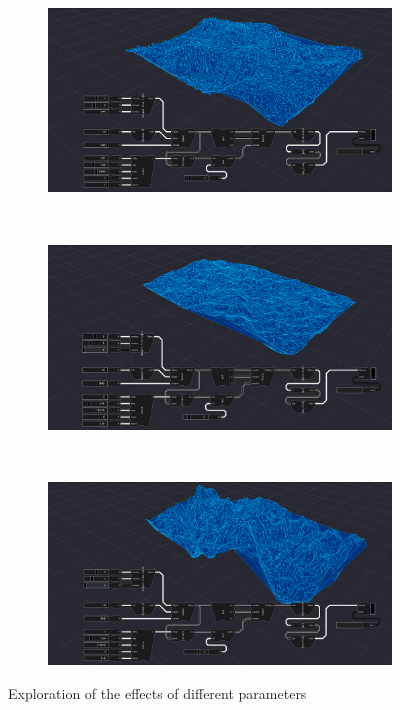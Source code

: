 \begin{figure}
  \centering
  \begin{subfigure}[b]{0.90\linewidth}
    \centering
    \includegraphics[width=\linewidth]{explore-1.PNG}
  \end{subfigure}%
  \\ 
  \begin{subfigure}[b]{0.90\linewidth}
    \centering
    \includegraphics[width=\linewidth]{explore-2.PNG}
  \end{subfigure}%
  \\
  \begin{subfigure}[b]{0.90\linewidth}
    \centering
    \includegraphics[width=\linewidth]{explore-3.PNG}
  \end{subfigure}%
  \caption[]{Exploration of the effects of different parameters}%
  \label{fig:parametrization}
\end{figure}


